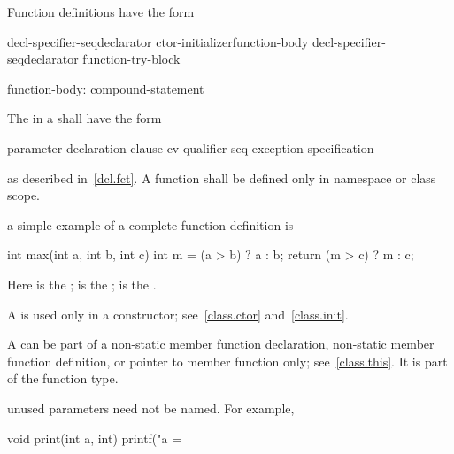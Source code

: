 \pnum
{}%
Function definitions have the form

%
%
\begin{bnf}
\br
    decl-specifier-seq\opt declarator ctor-initializer\opt function-body\br
    decl-specifier-seq\opt declarator function-try-block
\end{bnf}

\begin{bnf}
function-body:\br
    compound-statement
\end{bnf}

The
in a
shall have the form

\begin{ncsimplebnf}
 parameter-declaration-clause \terminal{)} cv-qualifier-seq\opt
exception-specification\opt
\end{ncsimplebnf}

as described in~\ref{dcl.fct}.
A function shall be defined only in namespace or class scope.

\pnum
\enterexample
a simple example of a complete function definition is

%
\begin{codeblock}
int max(int a, int b, int c)
{
    int m = (a > b) ? a : b;
    return (m > c) ? m : c;
}
\end{codeblock}

Here
is the
;
is the
;
is the
.
\exitexample

\pnum
{}%
%
%
A
is used only in a constructor; see~\ref{class.ctor} and~\ref{class.init}.

\pnum
A
can be part of a non-static member function declaration, non-static member function definition,
or pointer to member function only; see~\ref{class.this}.
It is part of the function type.

\pnum
\enternote
unused parameters need not be named.
For example,

%
\begin{codeblock}
void print(int a, int)
{
    printf("a = %
}
\end{codeblock}
\exitnoteb

